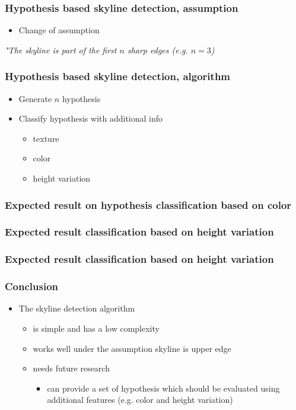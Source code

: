 \documentclass{beamer}
\begin{document}
\frame
{
	\frametitle{Hypothesis based skyline detection, assumption}
	\begin{itemize}
	\item <+-| alert@+> Change of assumption
	\end{itemize}
	\emph{"The skyline is part of the first $n$ sharp edges (e.g.  $n=3$)}
}

\frame
{
	\frametitle{Hypothesis based skyline detection, algorithm}
	\begin{itemize}
	\item <+-| alert@+> Generate $n$ hypothesis
	\item <+-| alert@+> Classify hypothesis with additional info
		\begin{itemize}
		\item <+-| alert@+> texture 
		\item <+-| alert@+> color
		\item <+-| alert@+> height variation 
		\end{itemize}
	\end{itemize}
}

\frame
{
	\frametitle{Expected result on hypothesis classification based on color}
}

\frame
{
	\frametitle{Expected result classification based on height variation}
}
\frame
{
	\frametitle{Expected result classification based on height variation}
}

\frame
{
	\frametitle{Conclusion}
	\begin{itemize}
	\item <+-| alert@+> The skyline detection algorithm 
		\begin{itemize}
		\item <+-| alert@+> is simple and has a low complexity
		\item <+-| alert@+> works well under the assumption skyline is upper edge
		\item <+-| alert@+> needs future research
			\begin{itemize}
			\item <+-| alert@+> can provide a set of hypothesis which should be evaluated using additional features
			(e.g. color and height variation)
			\end{itemize}
		\end{itemize}
	\end{itemize}
}
\end{document}
